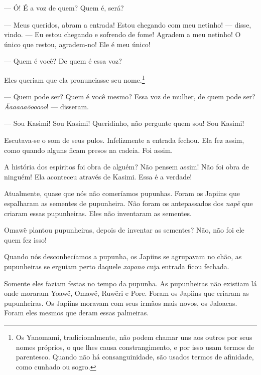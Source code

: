--- Ó! É a voz de quem? Quem é, será?

--- Meus queridos, abram a entrada! Estou chegando com meu netinho! ---
disse, vindo. --- Eu estou chegando e sofrendo de fome! Agradem a meu
netinho! O único que restou, agradem-no! Ele é meu único!

--- Quem é você? De quem é essa voz? 

Eles queriam que ela pronunciasse seu nome.\footnote{Os Yanomami, tradicionalmente, não podem chamar uns aos outros por seus nomes próprios, o que lhes causa constrangimento, e por isso usam termos de parentesco. Quando não há consanguinidade, são usados termos de afinidade, como cunhado ou sogro.} 

--- Quem pode ser? Quem é você mesmo? Essa voz de mulher, de quem pode
ser? \textit{Ãaaaaaõooooo}! --- disseram. 

--- Sou Kasimi! Sou Kasimi! Queridinho, não pergunte quem
sou! Sou Kasimi!

Escutava-se o som de seus pulos. Infelizmente a entrada fechou. Ela fez
 assim, como quando alguns ficam presos na
 cadeia. Foi assim. 

A história dos espíritos foi obra de alguém? Não pensem assim! Não foi
obra de ninguém! Ela aconteceu através de Kasimi. Essa é a verdade! 


Atualmente, quase que nós não comeríamos pupunhas. Foram os Japiins que
espalharam as sementes de pupunheira. Não foram os antepassados
dos \textit{napë} que criaram essas pupunheiras. Eles não inventaram as
sementes. 

Omawë plantou pupunheiras, depois de inventar as sementes? Não, não foi
ele quem fez isso!

Quando nós desconhecíamos a pupunha, os Japiins se agrupavam no chão, as
pupunheiras se erguiam perto daquele \textit{xapono} cuja entrada ficou fechada. 

Somente eles faziam festas no tempo da pupunha. As pupunheiras não
existiam lá onde moraram Yoawë, Omawë, Ruwëri e Pore. Foram os Japiins
que criaram as pupunheiras. Os Japiins moravam com seus irmãos mais
novos, os Jaloacas. Foram eles mesmos que deram essas palmeiras. 

